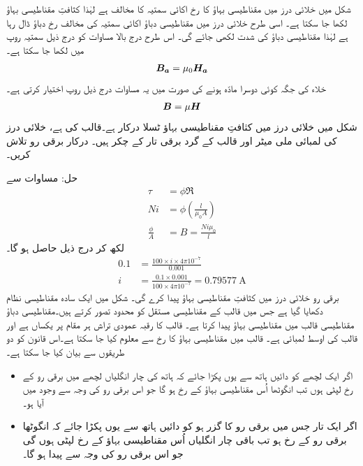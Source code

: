 شکل  میں خلائی درز میں مقناطیسی بہاؤ کا رخ  اکائی سمتیہ   کا مخالف ہے لہٰذا کثافتِ مقناطیسی بہاؤ  لکھا جا سکتا ہے۔ اسی طرح خلائی درز میں مقناطیسی دباؤ  اکائی سمتیہ  کی مخالف رخ دباؤ ڈال رہا ہے لہٰذا مقناطیسی دباؤ کی شدت   لکھی جائے گی۔ اس طرح درج بالا مساوات کو درج ذیل سمتیہ روپ میں  لکھا جا سکتا ہے۔
\begin{align}
{\ensuremath{{\boldsymbol{B_a}}}}=\mu_0 {{\boldsymbol{H_a}}}
\end{align}
خلاء کی جگہ کوئی دوسرا مادّہ ہونے کی صورت میں یہ مساوات  درج ذیل روپ اختیار کرتی ہے۔
\begin{align}
{\ensuremath{{\boldsymbol{B}}}}=\mu {\ensuremath{{\boldsymbol{H}}}}
\end{align}
%
شکل  میں خلائی درز میں کثافتِ مقناطیسی بہاؤ  ٹسلا درکار ہے۔قالب کی   ہے، خلائی درز کی لمبائی  ملی میٹر اور  قالب کے گرد برقی تار کے چکر   ہیں۔ درکار برقی رو  تلاش کریں۔

حل:\quad
مساوات  سے 
\begin{align*}
\tau&=\phi \Re\\
N i &= \phi \left(\frac{l}{\mu_0 A} \right)\\
\frac{\phi}{A}&=B=\frac{ N i \mu_0}{l}
\end{align*}
لکھ کر درج ذیل حاصل ہو گا۔
\begin{align*}
0.1&=\frac{100 \times i \times 4 \pi  10^{-7}}{0.001}\\
i&=\frac{0.1 \times 0.001}{100 \times 4 \pi  10^{-7}}=\SI{0.79577}{\ampere}
\end{align*}
 برقی رو  خلائی درز میں  کثافتِ مقناطیسی بہاؤ پیدا کرے گی۔
%
شکل  میں ایک سادہ مقناطیسی نظام دکھایا گیا ہے جس میں قالب کے مقناطیسی مستقل کو محدود تصور کرتے ہیں۔مقناطیسی دباؤ   مقناطیسی قالب میں مقناطیسی بہاؤ  پیدا کرتا ہے۔ قالب کا رقبہ عمودی تراش   ہر مقام پر  یکساں ہے اور قالب  کی اوسط لمبائی  ہے۔ قالب میں مقناطیسی بہاؤ  کا رخ
    سے معلوم کیا جا سکتا ہے۔اس قانون کو دو طریقوں سے بیان کیا جا سکتا ہے۔
\begin{itemize}
\item
اگر ایک لچھے کو دائیں ہاتھ سے یوں پکڑا  جائے کہ ہاتھ کی چار انگلیاں لچھے میں برقی رو کے رخ لپٹی  ہوں تب انگوٹھا اُس مقناطیسی بہاؤ کے رخ ہو گا جو اس برقی رو کی وجہ سے وجود میں آیا ہو۔
\item
اگر ایک تار جس میں برقی رو کا گزر ہو کو دائیں ہاتھ سے یوں پکڑا جائے کہ انگوٹھا  برقی رو  کے رخ ہو تب باقی چار انگلیاں اُس مقناطیسی  بہاؤ کے رخ لپٹی ہوں گی  جو اس برقی رو کی وجہ سے  پیدا ہو گا۔
\end{itemize}

